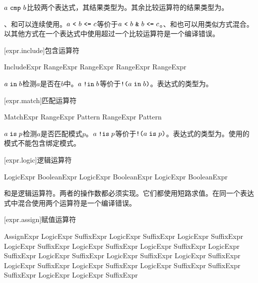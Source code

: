\pnum
$a\ \tcode{cmp}\ b$比较两个表达式，其结果类型为。其余比较运算符的结果类型为。

\pnum
\tcode{<}、\tcode{<=}和\tcode{==}可以连续使用。$a\ \tcode{<}\ b\ \tcode{<=}\ c$等价于$a\ \tcode{<}\ b\ \tcode{\&}\ b\ \tcode{<=}\ c$。\tcode{>}、\tcode{>=}和\tcode{==}也可以用类似方式混合。以其他方式在一个表达式中使用超过一个比较运算符是一个编译错误。

[expr.include]{包含运算符}

\begin{bnf}{IncludeExpr}
    RangeExpr  RangeExpr \br
    RangeExpr \terminal{!}  RangeExpr
\end{bnf}

\pnum
$a \mathrel{\texttt{in}} b$检测$a$是否在$b$中。$a \mathrel{\texttt{!in}} b$等价于$\texttt{!(}a \mathrel{\texttt{in}} b\texttt{)}$。表达式的类型为。

[expr.match]{匹配运算符}

\begin{bnf}{MatchExpr}
    RangeExpr  Pattern \br
    RangeExpr  Pattern
\end{bnf}

\pnum
$a \mathrel{\texttt{is}} p$检测$a$是否匹配模式$p$。$a \mathrel{\texttt{!is}} p$等价于$\texttt{!(}a \mathrel{\texttt{is}} p\texttt{)}$。表达式的类型为。使用的模式不能包含绑定模式。

[expr.logic]{逻辑运算符}

\begin{bnf}{LogicExpr}
    BooleanExpr \br
    LogicExpr \terminal{\&} BooleanExpr \br
    LogicExpr \terminal{|} BooleanExpr
\end{bnf}

\pnum
\tcode{\&}和\tcode{|}是逻辑运算符。两者的操作数都必须实现。它们都使用短路求值。在同一个表达式中混合使用两个运算符是一个编译错误。

[expr.assign]{赋值运算符}

\begin{bnf}{AssignExpr}
    LogicExpr \br
    SuffixExpr \terminal{=} LogicExpr \br
    SuffixExpr \terminal{+=} LogicExpr \br
    SuffixExpr \terminal{-=} LogicExpr \br
    SuffixExpr \terminal{*=} LogicExpr \br
    SuffixExpr \terminal{/=} LogicExpr \br
    SuffixExpr \terminal{\%=} LogicExpr \br
    SuffixExpr  LogicExpr \br
    SuffixExpr  LogicExpr \br
    SuffixExpr  LogicExpr \br
    SuffixExpr  LogicExpr \br
    SuffixExpr  LogicExpr \br
    SuffixExpr  LogicExpr \br
    SuffixExpr \terminal{++} \br
    SuffixExpr \terminal{--} \br
    SuffixExpr \terminal{<\~} LogicExpr \br
    LogicExpr \terminal{\~>} SuffixExpr
\end{bnf}


